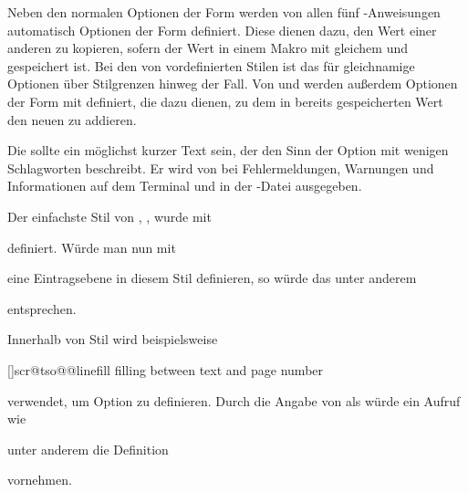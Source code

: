Neben den normalen Optionen der Form
 werden von allen fünf
-Anweisungen automatisch Optionen der Form
 definiert. Diese dienen
dazu, den Wert einer anderen  zu kopieren, sofern der
Wert in einem Makro mit gleichem  und 
gespeichert ist. Bei den von  vordefinierten Stilen ist das
für gleichnamige Optionen über Stilgrenzen hinweg der Fall. Von
 und 
werden außerdem Optionen der Form  mit
definiert, die dazu dienen, zu dem in
 bereits
gespeicherten Wert den neuen  zu addieren.

Die  sollte ein möglichst kurzer Text sein, der den Sinn der
Option mit wenigen Schlagworten beschreibt. Er wird von  bei
Fehlermeldungen, Warnungen und Informationen auf dem Terminal und in der
-Datei ausgegeben.

Der einfachste Stil von , , wurde mit
\begin{lstcode}
\end{lstcode}
definiert. Würde man nun mit
\begin{lstcode}
\end{lstcode}
eine Eintragsebene  in diesem Stil definieren, so würde das
unter anderem
\begin{lstcode}
  \def\dummytocdepth{1}
  \def\l@dummy#1#2{}
\end{lstcode}
entsprechen.

Innerhalb von Stil  wird beispielsweise
\begin{lstcode}
    [\TOCLineLeaderFill]{scr@tso@}{@linefill}%
    {filling between text and page number}%
\end{lstcode}
verwendet, um Option  zu definieren. Durch die Angabe von
 als  würde ein
Aufruf wie
\begin{lstcode}
\end{lstcode}
unter anderem die Definition
\begin{lstcode}
  \def\scr@tso@part@linefill{\TOCLineLeaderFill}
\end{lstcode}
vornehmen.

